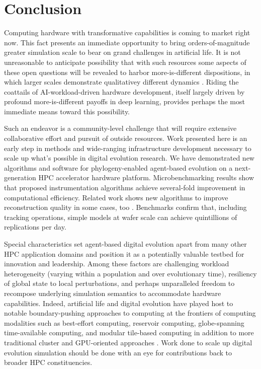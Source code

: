 \section{Conclusion} \label{sec:conclusion}

Computing hardware with transformative capabilities is coming to market right now.
This fact presents an immediate opportunity to bring orders-of-magnitude greater simulation scale to bear on grand challenges in artificial life.
It is not unreasonable to anticipate possibility that with such resources some aspects of these open questions will be revealed to harbor more-is-different dispositions, in which larger scales demonstrate qualitativey different dynamics \citep{anderson1972more}.
Riding the coattails of AI-workload-driven hardware development, itself largely driven by profound more-is-different payoffs in deep learning, provides perhaps the most immediate means toward this possibility.

Such an endeavor is a community-level challenge that will require extensive collaborative effort and pursuit of outside resources.
Work presented here is an early step in methods and wide-ranging infrastructure development necessary to scale up what's possible in digital evolution research.
We have demonstrated new algorithms and software for phylogeny-enabled agent-based evolution on a next-generation HPC accelerator hardware platform.
Microbenchmarking results show that proposed instrumentation algorithms achieve several-fold improvement in computational efficiency.
Related work shows new algorithms to improve reconstruction quality in some cases, too \citep{moreno2024guide}.
Benchmarks confirm that, including tracking operations, simple models at wafer scale can achieve quintillions of replications per day.

Special characteristics set agent-based digital evolution apart from many other HPC application domains and position it as a potentially valuable testbed for innovation and leadership.
Among these factors are challenging workload heterogeneity (varying within a population and over evolutionary time), resiliency of global state to local perturbations, and perhaps unparalleled freedom to recompose underlying simulation semantics to accommodate hardware capabilities.
Indeed, artificial life and digital evolution have played host to notable boundary-pushing approaches to computing at the frontiers of computing modalities such as best-effort computing, reservoir computing, globe-spanning time-available computing, and modular tile-based computing in addition to more traditional cluster and GPU-oriented approaches \citep{moreno2021conduit,ackley2020best,ackley2023robust,heinemann2008artificial,miikkulainen2024evolving}.
Work done to scale up digital evolution simulation should be done with an eye for contributions back to broader HPC constituencies.

